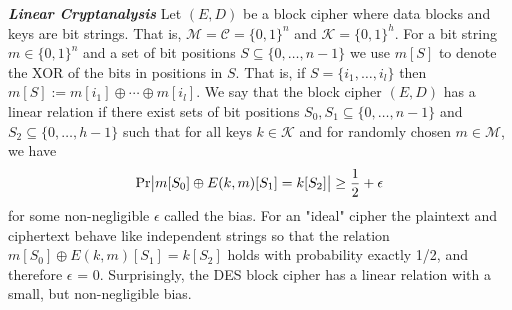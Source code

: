 \documentclass[a4paper,12pt,UTF8]{ctexart}
\begin{document}
\begin{spacing}{1.1}
\newline\indent\emph{\textbf{Linear Cryptanalysis}} Let $(E,D)$ be a block cipher where data blocks and keys are bit strings. That is, $\mathcal{M} = \mathcal{C} = \{0,1\}^n$ and $\mathcal{K} = \{0,1\}^h$. 
\newline\indent For a bit string $m\in{\{0,1\}} ^n$ and a set of bit positions $S\subseteq{\{0,\dotsc,n-1\}}$ we use $m[S]$ to denote the XOR of the bits in positions in $S$. That is, if $S =\{i_1,\dotsc,i_l\}$ then $m[S]:= m[i_1]\oplus\dotsm\oplus m[i_l]$. We say that the block cipher $(E,D)$ has a linear relation if there exist sets of bit positions $S_0,S_1\subseteq{\{0,\dotsc,n-1\}}$ and $S_2\subseteq{\{0,\dotsc,h-1\}}$ such that for all keys $k\in{\mathcal{K}}$ and for randomly chosen $m\in{\mathcal{M}}$, we have 
\begin{equation}
{\rm Pr}\big|m[S_0]\oplus E(k,m)[S_1] = k[S_2]\big|\geq\dfrac{1}{2}+\epsilon
\end{equation}
\indent for some non-negligible $\epsilon$ called the bias. For an "ideal" cipher the plaintext and ciphertext behave like independent strings so that the relation $m[S_0]\oplus E(k,m)[S_1] = k[S_2]$ holds with probability exactly 1/2, and therefore $\epsilon$ = 0. Surprisingly, the DES block cipher has a linear relation with a small, but non-negligible bias. \vspace{3mm}

\end{spacing}
\end{document}
